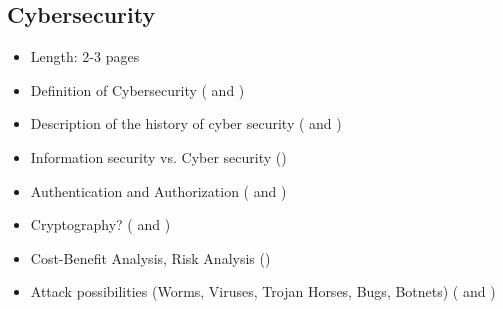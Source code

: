 \subsection{Cybersecurity}

\begin{itemize}
  \item Length: 2-3 pages
  \item Definition of Cybersecurity (\cite{Bishop2003b} and \cite{Bishop2004})
  \item Description of the history of cyber security (\cite{Hansen2016} and \cite{Bishop2004})
  \item Information security vs. Cyber security (\cite{VonSolms2013})
  \item Authentication and Authorization (\cite{Bishop2004} and \cite{Pfleeger2014})
  \item Cryptography? (\cite{Bishop2004} and \cite{Pfleeger2014})
  \item Cost-Benefit Analysis, Risk Analysis (\cite{Bishop2004})
  \item Attack possibilities (Worms, Viruses, Trojan Horses, Bugs, Botnets) (\cite{Bishop2004} and \cite{Pfleeger2014})
\end{itemize}
